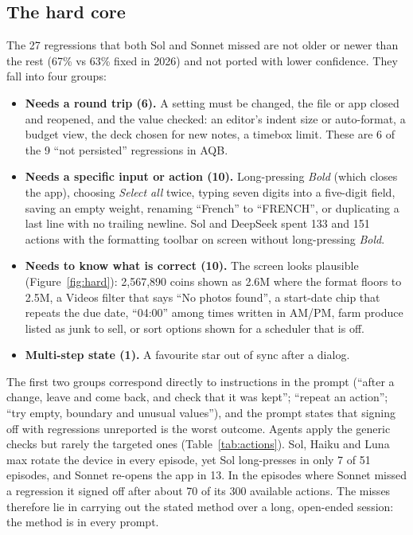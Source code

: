 \documentclass[11pt]{article}
\newcommand{\aqb}{\textsc{AQB}}
\begin{document}
\subsection{The hard core}
The 27 regressions that both Sol and Sonnet missed are not older or newer than the rest (67\% vs
63\% fixed in 2026) and not ported with lower confidence. They fall into four groups:
\begin{itemize}
  \item \textbf{Needs a round trip (6).} A setting must be changed, the file or app closed and
    reopened, and the value checked: an editor's indent size or auto-format, a budget view, the deck
    chosen for new notes, a timebox limit. These are 6 of the 9 ``not persisted'' regressions in
    \aqb{}.
  \item \textbf{Needs a specific input or action (10).} Long-pressing \emph{Bold} (which closes the
    app), choosing \emph{Select all} twice, typing seven digits into a five-digit field, saving an
    empty weight, renaming ``French'' to ``FRENCH'', or duplicating a last line with no trailing
    newline. Sol and DeepSeek spent 133 and 151 actions with the formatting toolbar on
    screen without long-pressing \emph{Bold}.
  \item \textbf{Needs to know what is correct (10).} The screen looks plausible
    (Figure~\ref{fig:hard}): 2,567,890 coins shown as 2.6M where the format floors to 2.5M, a Videos
    filter that says ``No photos found'', a start-date chip that repeats the due date, ``04:00''
    among times written in AM/PM, farm produce listed as junk to sell, or sort options shown for a
    scheduler that is off.
  \item \textbf{Multi-step state (1).} A favourite star out of sync after a dialog.
\end{itemize}
The first two groups correspond directly to instructions in the prompt (``after a change, leave and
come back, and check that it was kept''; ``repeat an action''; ``try empty, boundary and unusual
values''), and the prompt states that signing off with regressions unreported is the worst outcome.
Agents apply the generic checks but rarely the targeted ones (Table~\ref{tab:actions}). Sol, Haiku
and Luna max rotate the device in every episode, yet Sol long-presses in only 7 of 51 episodes, and
Sonnet re-opens the app in 13. In the episodes where Sonnet missed a regression it signed off after
about 70 of its 300 available actions. The misses therefore lie in carrying out the stated method
over a long, open-ended session: the method is in every prompt.
\end{document}
